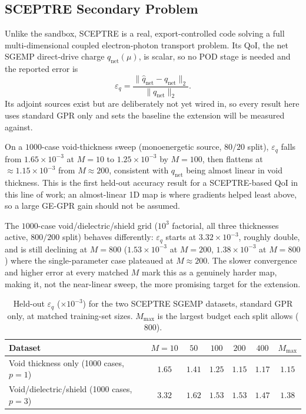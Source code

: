 \documentclass[]{ANStopical}
\begin{document}
\subsection{SCEPTRE Secondary Problem}\label{sec:sceptre}

Unlike the sandbox, SCEPTRE is a real, export-controlled code solving a full multi-dimensional coupled electron-photon transport problem. Its QoI, the net SGEMP direct-drive charge $q_{\mathrm{net}}(\mu)$, is scalar, so no POD stage is needed and the reported error is
\begin{equation}
    \varepsilon_q = \frac{\lVert \hat q_{\mathrm{net}} - q_{\mathrm{net}}\rVert_2}{\lVert q_{\mathrm{net}}\rVert_2}.
    \label{eq:epsq}
\end{equation}
Its adjoint sources exist but are deliberately not yet wired in, so every result here uses standard GPR only and sets the baseline the extension will be measured against.

On a $1000$-case void-thickness sweep (monoenergetic source, $80/20$ split), $\varepsilon_q$ falls from $1.65\times10^{-3}$ at $M{=}10$ to $1.25\times10^{-3}$ by $M{=}100$, then flattens at $\approx1.15\times10^{-3}$ from $M{\approx}200$, consistent with $q_{\mathrm{net}}$ being almost linear in void thickness. This is the first held-out accuracy result for a SCEPTRE-based QoI in this line of work; an almost-linear 1D map is where gradients helped least above, so a large GE-GPR gain should not be assumed.

The $1000$-case void/dielectric/shield grid ($10^3$ factorial, all three thicknesses active, $800/200$ split) behaves differently: $\varepsilon_q$ starts at $3.32\times10^{-3}$, roughly double, and is still declining at $M{=}800$ ($1.53\times10^{-3}$ at $M{=}200$, $1.38\times10^{-3}$ at $M{=}800$) where the single-parameter case plateaued at $M{\approx}200$. The slower convergence and higher error at every matched $M$ mark this as a genuinely harder map, making it, not the near-linear sweep, the more promising target for the extension.

\begin{table}[!ht]
\caption{Held-out $\varepsilon_q$ ($\times10^{-3}$) for the two SCEPTRE SGEMP datasets, standard GPR only, at matched training-set sizes. $M_{\max}$ is the largest budget each split allows ($800$).}
\label{tab:sceptre}
\begin{center}
\small
\begin{tabular}{lcccccc}
\hline
Dataset & $M{=}10$ & $50$ & $100$ & $200$ & $400$ & $M_{\max}$ \\
\hline
Void thickness only (1000 cases, $p{=}1$)    & $1.65$ & $1.41$ & $1.25$ & $1.15$ & $1.17$ & $1.15$ \\
Void/dielectric/shield (1000 cases, $p{=}3$) & $3.32$ & $1.62$ & $1.53$ & $1.53$ & $1.47$ & $1.38$ \\
\hline
\end{tabular}
\end{center}
\end{table}
\end{document}
